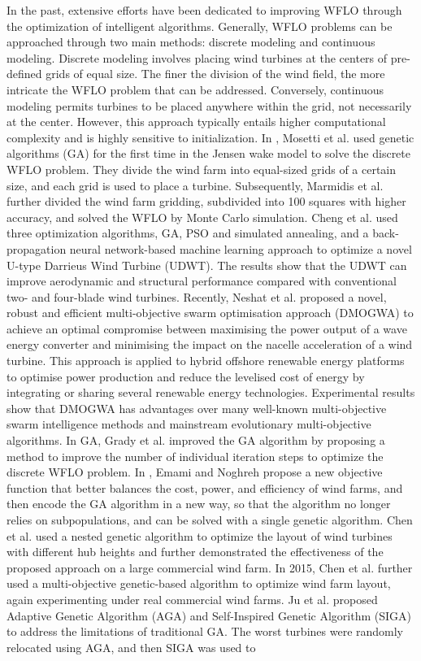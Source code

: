 \documentclass[review]{elsarticle}
\begin{document}
In the past, extensive efforts have been dedicated to improving WFLO through the optimization of intelligent algorithms. Generally, WFLO problems can be approached through two main methods: discrete modeling and continuous modeling. Discrete modeling involves placing wind turbines at the centers of pre-defined grids of equal size. The finer the division of the wind field, the more intricate the WFLO problem that can be addressed. Conversely, continuous modeling permits turbines to be placed anywhere within the grid, not necessarily at the center. However, this approach typically entails higher computational complexity and is highly sensitive to initialization. In \cite{mosetti1994optimization}, Mosetti et al. used genetic algorithms (GA) for the first time in the Jensen wake model to solve the discrete WFLO problem. They divide the wind farm into equal-sized grids of a certain size, and each grid is used to place a turbine. Subsequently, Marmidis et al. \cite{marmidis2008optimal} further divided the wind farm gridding, subdivided into 100 squares with higher accuracy, and solved the WFLO by Monte Carlo simulation. Cheng et al. \cite{cheng2022design} used three optimization algorithms, GA, PSO and simulated annealing, and a back-propagation neural network-based machine learning approach to optimize a novel U-type Darrieus Wind Turbine (UDWT). The results show that the UDWT can improve aerodynamic and structural performance compared with conventional two- and four-blade wind turbines. Recently, Neshat et al. \cite{neshat2024enhancing} proposed a novel, robust and efficient multi-objective swarm optimisation approach (DMOGWA) to achieve an optimal compromise between maximising the power output of a wave energy converter and minimising the impact on the nacelle acceleration of a wind turbine. This approach is applied to hybrid offshore renewable energy platforms to optimise power production and reduce the levelised cost of energy by integrating or sharing several renewable energy technologies. Experimental results show that DMOGWA has advantages over many well-known multi-objective swarm intelligence methods and mainstream evolutionary multi-objective algorithms. In GA, Grady et al. \cite{grady2005placement} improved the GA algorithm by proposing a method to improve the number of individual iteration steps to optimize the discrete WFLO problem. In \cite{emami2010new}, Emami and Noghreh propose a new objective function that better balances the cost, power, and efficiency of wind farms, and then encode the GA algorithm in a new way, so that the algorithm no longer relies on subpopulations, and can be solved with a single genetic algorithm. Chen et al. \cite{chen2013wind} used a nested genetic algorithm to optimize the layout of wind turbines with different hub heights and further demonstrated the effectiveness of the proposed approach on a large commercial wind farm. In 2015, Chen et al. \cite{chen2013wind} further used a multi-objective genetic-based algorithm to optimize wind farm layout, again experimenting under real commercial wind farms. Ju et al. \cite{ju2019wind} proposed Adaptive Genetic Algorithm (AGA) and Self-Inspired Genetic Algorithm (SIGA) to address the limitations of traditional GA. The worst turbines were randomly relocated using AGA, and then SIGA was used to 
\end{document}

